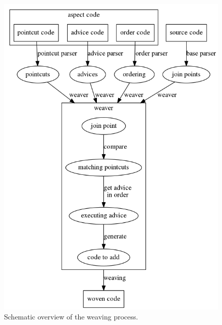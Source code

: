 \documentclass[a4paper]{report}
\begin{document}
\begin{figure}[h!]
\centering
\includegraphics[scale=0.45]{images/AOF/Weaving.png}
\caption{Schematic overview of the weaving process.}
\label{fig:Weaving}
\end{figure}
\end{document}
